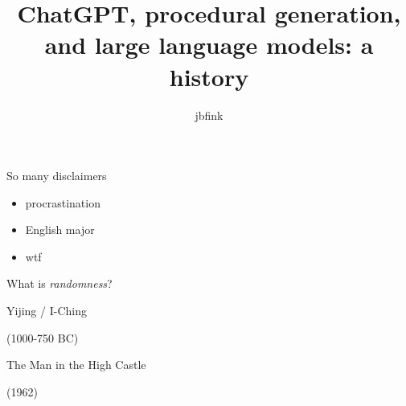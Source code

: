 \documentclass{beamer}
\title{ChatGPT, procedural generation, and large language models: a history}
\author{jbfink}
\begin{document}
\begin{frame}
    \maketitle
\end{frame}

\begin{frame}{So many disclaimers}
\begin{itemize}
	\item procrastination
	\pause
	\item English major
	\pause
	\item wtf
\end{itemize}
\end{frame}

 
 \begin{frame}
 	What is \textit{randomness}?
 \end{frame}

\begin{frame}[c]
	\centering
	\Huge
	Yijing / I-Ching
	
	(1000-750 BC)
\end{frame}
  
  \begin{frame}[plain]
  \end{frame}
  \begin{frame}[c]
  	\centering
  	\Huge
  	The Man in the High Castle
  	
  	(1962)
  \end{frame}
\end{document}
